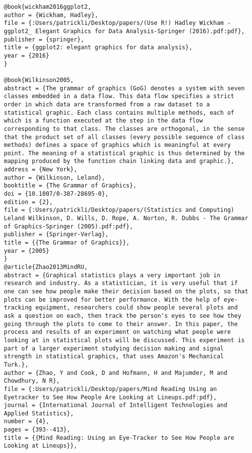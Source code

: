 \documentclass[
]{book}
\begin{document}
\begin{verbatim}
@book{wickham2016ggplot2,
author = {Wickham, Hadley},
file = {:Users/patrickli/Desktop/papers/(Use R!) Hadley Wickham - ggplot2_ Elegant Graphics for Data Analysis-Springer (2016).pdf:pdf},
publisher = {springer},
title = {ggplot2: elegant graphics for data analysis},
year = {2016}
}

@book{Wilkinson2005,
abstract = {The grammar of graphics (GoG) denotes a system with seven classes embedded in a data flow. This data flow specifies a strict order in which data are transformed from a raw dataset to a statistical graphic. Each class contains multiple methods, each of which is a function executed at the step in the data flow corresponding to that class. The classes are orthogonal, in the sense that the product set of all classes (every possible sequence of class methods) defines a space of graphics which is meaningful at every point. The meaning of a statistical graphic is thus determined by the mapping produced by the function chain linking data and graphic.},
address = {New York},
author = {Wilkinson, Leland},
booktitle = {The Grammar of Graphics},
doi = {10.1007/0-387-28695-0},
edition = {2},
file = {:Users/patrickli/Desktop/papers/(Statistics and Computing) Leland Wilkinson, D. Wills, D. Rope, A. Norton, R. Dubbs - The Grammar of Graphics-Springer (2005).pdf:pdf},
publisher = {Springer-Verlag},
title = {{The Grammar of Graphics}},
year = {2005}
}
@article{Zhao2013MindRU,
abstract = {Graphical statistics plays a very important job in research and industry. As a statistician, it is very useful that if one can see how people make their decision based on the plots, so that plots can be improved for better performance. With the help of eye-tracking equipment, researchers could show people several plots and ask a question on each, then track the person's eyes to see how they going through the plots to come to their answer. In this paper, the process and results of an experiment on watching what people were looking at in statistical plots will be discussed. This experiment is part of a larger experiment studying decision making and signal strength in statistical graphics, that uses Amazon's Mechanical Turk.},
author = {Zhao, Y and Cook, D and Hofmann, H and Majumder, M and Chowdhury, N R},
file = {:Users/patrickli/Desktop/papers/Mind Reading Using an Eyetracker to See How People Are Looking at Lineups.pdf:pdf},
journal = {International Journal of Intelligent Technologies and Applied Statistics},
number = {4},
pages = {393--413},
title = {{Mind Reading: Using an Eye-Tracker to See How People are Looking at Lineups}},

\end{verbatim}
\end{document}
